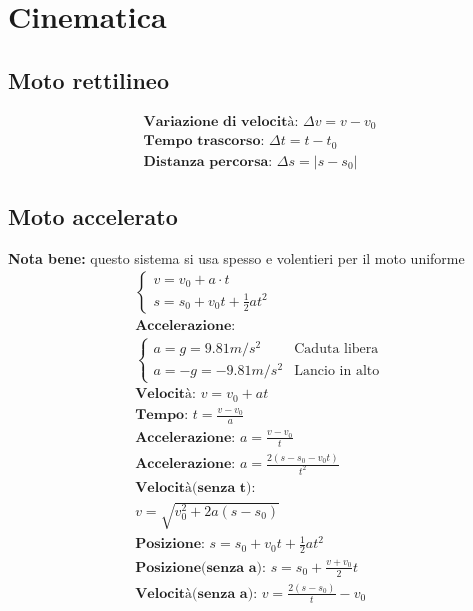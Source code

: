 \section{Cinematica}
\subsection{Moto rettilineo}
\begin{gather*}
    \textbf{Variazione di velocità: } \Delta v = v - v_0 \\
    \textbf{Tempo trascorso: } \Delta t = t - t_0 \\
    \textbf{Distanza percorsa: } \Delta s = \left| s - s_0 \right|
\end{gather*}
\subsection{Moto accelerato}
\textbf{Nota bene: } questo sistema si usa spesso e volentieri per il moto uniforme
\begin{gather*}
    \begin{cases}
        v = v_0 + a \cdot t \\
        s = s_0 + v_0 t + \frac{1}{2} a t^2
    \end{cases}
    \\
    \textbf{Accelerazione:} \\
    \begin{cases}
        a = g = 9.81 m/s^2   & \text{Caduta libera}  \\
        a = -g = - 9.81m/s^2 & \text{Lancio in alto}
    \end{cases}
    \\
    \textbf{Velocità: } v = v_0 + a t \\
    \textbf{Tempo: } t = \frac{v - v_0}{a} \\
    \textbf{Accelerazione: } a = \frac{v - v_0}{t} \\
    \textbf{Accelerazione: } a = \frac{2 (s - s_0 - v_0 t)}{t^2} \\
    \textbf{Velocità(senza t): } \\ v = \sqrt{v_0^2 + 2 a (s - s_0)} \\
    \textbf{Posizione: } s = s_0 + v_0 t + \frac{1}{2} a t^2 \\
    \textbf{Posizione(senza a): } s = s_0 + \frac{v + v_0}{2} t \\
    \textbf{Velocità(senza a): } v = \frac{2 (s - s_0)}{t} - v_0
\end{gather*}
